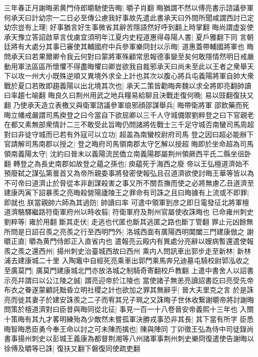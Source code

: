 三年春正月謝晦弟黄門侍郎㬭馳使告晦|{
	㬭子肖翻}
晦猶謂不然以傅亮書示諮議參軍何承天曰計幼宗一二日必至傳公慮我好事故先遣此書承天曰外間所聞咸謂西討已定幼宗豈有上理|{
	好事猶言好生事微省其辭苦隱語然好呼到翻上時掌翻}
晦尚謂虚妄使承天豫立答詔啟草言伐虜宜須明年江夏内史程道惠得尋陽人書|{
	夏戶雅翻下同}
言朝廷將有大處分其事已審使其輔國府中兵參軍樂冏封以示晦|{
	道惠蓋帶輔國將軍也}
晦問承天曰若果爾卿令我云何對曰蒙將軍殊顧常思報德事變至矣何敢隱情然明日戒嚴動用軍法區區所懷懼不得盡晦懼曰卿豈欲我自裁邪承天曰尚未至此以王者之衆舉天下以攻一州大小既殊逆順又異境外求全上計也其次以腹心將兵屯義陽將軍自帥大衆戰於夏口若敗即趨義陽以出北境其次也|{
	承天二策皆勸晦奔魏以求全將即亮翻帥讀曰率趨七喻翻}
晦良久曰荆州用武之地兵糧易給聊且決戰走復何晩|{
	易以豉翻復扶又翻}
乃使承天造立表檄又與衛軍諮議參軍琅邪顔邵謀舉兵|{
	晦帶衛將軍}
邵飲藥而死晦立幡戒嚴謂司馬庾登之曰今當自下欲屈卿以三千人守城備禦劉粹登之曰下官親老在都又素無部衆情計二三不敢受此旨晦仍問諸將佐戰士三千足守城否南蠻司馬周超對曰非徒守城而已若有外寇可以立功|{
	超盖為南蠻校尉府司馬}
登之因曰超必能辦下官請解司馬南郡以授之|{
	登之晦府司馬領南郡太守乞解以授超}
晦即於坐命超為司馬領南義陽太守|{
	沈約曰晉末以義陽流民僑立南義陽郡屬荆州領厥西平氏二縣坐徂卧翻}
轉登之為長史南郡如故登之蘊之孫也|{
	庾藴死于海西之廢}
帝以王弘檀道濟始不預廢弑之謀弘第曇首又為帝所親委事將發密使報弘且召道濟欲使討晦王華等皆以為不可帝曰道濟止於脅從本非創謀殺害之事又所不關吾撫而使之必將無慮乙丑道濟至建康丙寅下詔暴羨之亮晦殺營陽廬陵王之罪命有司誅之且曰晦據有上流或不即罪|{
	即就也}
朕當親帥六師為其過防|{
	帥讀曰率}
可遣中領軍到彦之即日電發征北將軍檀道濟駱驛繼路符衛軍府州以時收翦|{
	符衛軍府及荆州官屬使收誅晦也}
已命雍州刺史劉粹等|{
	雍於用翻}
斷其走伏|{
	走逃也代匿也斷其逃匿之路也斷丁管翻}
罪止元凶餘無所問是日詔召羨之亮羨之行至西明門外|{
	洛城西面有廣陽西明閶闔三門建康倣之}
謝㬭正直|{
	㬭為黄門侍郎正入直省内也}
遣報亮云殿内有異處分亮辭以嫂病暫還遣使報羨之羨之還西州|{
	揚州刺史治臺城西故曰西州}
乘内人問訊車出郭步走至新林|{
	新林浦去建康城二十里}
入陶竈中自經死亮乘車出郭門乘馬奔兄迪墓屯騎校尉郭泓收之至廣莫門|{
	廣莫門建康城北門亦放洛城之制騎奇寄翻校戶教翻}
上遣中書舍人以詔書示亮幷謂曰以公江陵之誠|{
	謂亮迎帝於江陵也}
當使諸子無恙亮讀詔書訖曰亮受先帝布衣之眷遂蒙顧託黜昏立明社稷之計也欲加之罪其無辭乎|{
	晉大夫里克之言}
於是誅亮而徙其妻子於建安誅羨之二子而宥其兄子珮之又誅晦子世休收繋謝㬭帝將討謝晦問策於檀道濟對曰臣昔與晦同從北征|{
	事見一百一十八卷晉安帝義熙十三年也}
入關十策晦有其九才畧明練殆為少敵然未嘗孤軍決勝戎事恐非其長|{
	其下當有所字}
臣悉晦智晦悉臣勇今奉王命以討之可未陳而擒也|{
	陳與陣同}
丁卯徵王弘為侍中司徒錄尚書事揚州刺史以彭城王義康為都督荆湘等八州諸軍事荆州刺史樂冏復遣使告謝晦以徐傅及㬭等已誅|{
	復扶又翻下磐復同使疏吏翻}

